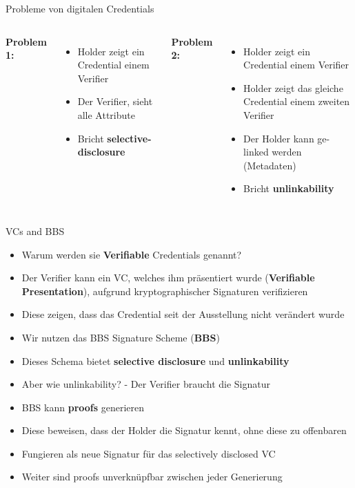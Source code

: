 \documentclass[
	german,%
	authorontitle=true,
	]{bfhbeamer}
\begin{document}
\begin{frame}{Probleme von digitalen Credentials}
    \begin{columns}[onlytextwidth,T]
        \column{70mm}  
        \textbf{Problem 1:}
        \begin{itemize}
            \item Holder zeigt ein Credential einem Verifier
            \item Der Verifier, sieht alle Attribute
            \item Bricht \textbf{selective-disclosure}
        \end{itemize}

        \column{70mm}  
        \textbf{Problem 2:}
        \begin{itemize}
            \item Holder zeigt ein Credential einem Verifier
            \item Holder zeigt das gleiche Credential einem zweiten Verifier
            \item Der Holder kann ge-linked werden (Metadaten)
            \item Bricht \textbf{unlinkability}
        \end{itemize}

    \end{columns}
\end{frame}


\begin{frame}{VCs and BBS}
    \begin{itemize}
        \item Warum werden sie \textbf{Verifiable} Credentials genannt?
        \item Der Verifier kann ein VC, welches ihm präsentiert wurde (\textbf{Verifiable Presentation}), aufgrund kryptographischer Signaturen verifizieren
        \item Diese zeigen, dass das Credential seit der Ausstellung nicht verändert wurde
        \item Wir nutzen das BBS Signature Scheme (\textbf{BBS}) 
        \item Dieses Schema bietet \textbf{selective disclosure} und \textbf{unlinkability}
        \item Aber wie unlinkability? - Der Verifier braucht die Signatur
        \item BBS kann \textbf{proofs} generieren
        \item Diese beweisen, dass der Holder die Signatur kennt, ohne diese zu offenbaren
        \item Fungieren als neue Signatur für das selectively disclosed VC
        \item Weiter sind proofs unverknüpfbar zwischen jeder Generierung
    \end{itemize}
\end{frame}
\end{document}
